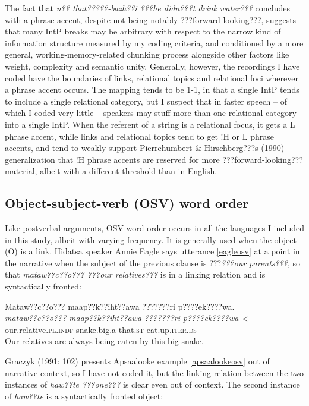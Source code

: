 \documentclass[output=paper]{LSP/langsci}
\begin{document}
The fact that \emph{n?? that?????-bazh??i ???he didn???t drink water???} concludes with a phrase accent, despite not being notably ???forward-looking???, suggests that many IntP breaks may be arbitrary with respect to the narrow kind of information structure measured by my coding criteria, and conditioned by a more general, working-memory-related chunking process alongside other factors like weight, complexity and semantic unity. Generally, however, the recordings I have coded have the boundaries of links, relational topics and relational foci wherever a phrase accent occurs. The mapping tends to be 1-1, in that a single IntP tends to include a single relational category, but I suspect that in faster speech -- of which I coded very little -- speakers may stuff more than one relational category into a single IntP. When the referent of a string is a relational focus, it gets a L phrase accent, while links and relational topics tend to get !H or L phrase accents, and tend to weakly support Pierrehumbert \& Hirschberg???s (1990) generalization that !H phrase accents are reserved for more ???forward-looking??? material, albeit with a different threshold than in English.

\subsection{Object-subject-verb (OSV) word order}\label{osv}

Like postverbal arguments, OSV word order occurs in all the languages I included in this study, albeit with varying frequency. It is generally used when the object (O) is a link. Hidatsa speaker Annie Eagle says utterance \ref{eagleosv} at a point in the narrative when the subject of the previous clause is ???\emph{???our parents???}, so that \emph{mataw??c??o??? ???our relatives???} is in a linking relation and is syntactically fronted:

\ea\label{eagleosv}
Mataw??c??o??? maap??k??iht??awa ???????ri p????ek????wa.\footnotemark\\
\gll	\emph{\underline{mataw??c??o???}}		\emph{maap??k??iht??awa} 	\emph{???????ri} 	\emph{p????ek????wa <}\\
	our.relative.\textsc{pl.indf} 		snake.big.a 			that.\textsc{st} 	eat.up.\textsc{iter.ds}\\
\glt	Our relatives are always being eaten by this big snake.
\z

Graczyk (1991: 102) presents Apsaalooke example \ref{apsaalookeosv} out of narrative context, so I have not coded it, but the linking relation between the two instances of \emph{haw??te ???one???} is clear even out of context. The second instance of \emph{haw??te} is a syntactically fronted object:
\end{document}
